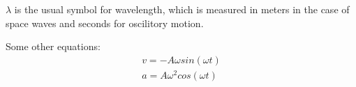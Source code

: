 \documentclass{report}
\begin{document}
\begin{description}
\begin{mdframed}
            \begin{mdframed}
                $\lambda$ is the usual symbol for wavelength,
                which is measured in meters in the case
                of space waves and seconds for oscilitory
                motion.
            \end{mdframed}
            
            Some other equations:
            \begin{gather}
               v = -A\omega sin(\omega t)\\ 
               a = A \omega^2 cos(\omega t)
            \end{gather}
            
            
        \end{mdframed}
\end{description}
\end{document}
